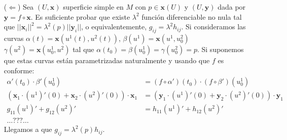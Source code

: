 \documentclass[twoside]{article}
\newcommand{\x}{{\mathbf{x}}}
\newcommand{\y}{{\mathbf{y}}}
\begin{document}
\begin{solucion}
\begin{itemize}
\item[($\Leftarrow$)] Sea $(U,\x)$ superficie simple en $M$ con $p \in \x(U)$ y $(U,\y)$ dada por $\y = f \circ \x$. Es suficiente probar que existe $λ^2$ función diferenciable no nula tal que $||\x_i||^2 = λ^2(p) ||\y_i||$, o equivalentemente, $g_{ij}= λ^2 h_{ij}$. Si consideramos las curvas $α(t)=\x(u^1(t),u^2(t))$, $β(u^1)=\x(u^1,u_0^2)$ $γ(u^2)=\x(u_0^1,u^2)$ tal que $α(t_0)=β(u_0^1)=γ(u_0^2)=p$. Si suponemos que estas curvas están parametrizadas naturalmente y usando que $f$ es conforme:
\begin{align*}
	α'(t_0)\cdot β'(u_0^1) & = (f \circ α') (t_0) \cdot (f \circ β')(u_0^1)\\
	(\x_1 \cdot (u^1)'(0) + \x_2 \cdot (u^2)'(0)) \cdot \x_1 & = (\y_1 \cdot (u^1)'(0) + \y_2 \cdot (u^2)'(0)) \cdot \y_1\\
	g_{11} (u^1)' + g_{12}(u^2)' & = h_{11}(u^1)'+h_{12}(u^2)'\\
	\dots ??? \dots
\end{align*} 
Llegamos a que $g_{ij}=λ^2(p)h_{ij}$.
\end{itemize}
\end{solucion}
\end{document}
